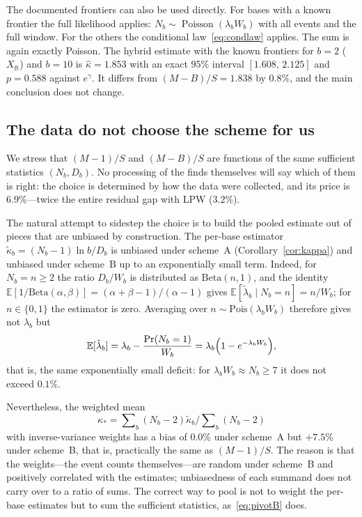 \documentclass[11pt,a4paper]{article}
\theoremstyle{plain}
\theoremstyle{remark}
\newcommand{\eg}{e^{\gamma}}
\DeclareMathOperator{\Pois}{Poisson}
\begin{document}
The documented frontiers can also be used directly. For bases with a known
frontier the full likelihood applies: $N_b\sim\Pois(\lambda_bW_b)$ with all
events and the full window. For the others the conditional
law~\eqref{eq:condlaw} applies. The sum is again exactly Poisson. The hybrid
estimate with the known frontiers for $b=2$ ($X_{\mathrm{ft}}$) and $b=10$ is
$\hat\kappa=1.853$ with an exact $95\%$ interval $[1.608,\,2.125]$ and
$p=0.588$ against $\eg$. It differs from $(M-B)/S=1.838$ by $0.8\%$, and the
main conclusion does not change.

\subsection{The data do not choose the scheme for us}\label{sec:noescape}

We stress that $(M-1)/S$ and $(M-B)/S$ are functions of the same sufficient
statistics $(N_b,D_b)$. No processing of the finds themselves will say which of
them is right: the choice is determined by how the data were collected, and its
price is $6.9\%$---twice the entire residual gap with LPW ($3.2\%$).

The natural attempt to sidestep the choice is to build the pooled estimate out
of pieces that are unbiased by construction. The per-base estimator
$\tilde\kappa_b=(N_b-1)\ln b/D_b$ is unbiased under scheme~A
(Corollary~\ref{cor:kappa}) and unbiased under scheme~B up to an exponentially
small term. Indeed, for $N_b=n\ge2$ the ratio $D_b/W_b$ is distributed as
$\mathrm{Beta}(n,1)$, and the identity
$\mathbb E[1/\mathrm{Beta}(\alpha,\beta)]=(\alpha+\beta-1)/(\alpha-1)$ gives
$\mathbb E[\tilde\lambda_b\mid N_b=n]=n/W_b$; for $n\in\{0,1\}$ the estimator is
zero. Averaging over $n\sim\mathrm{Pois}(\lambda_bW_b)$ therefore gives not
$\lambda_b$ but
\[
  \mathbb E[\tilde\lambda_b]=\lambda_b-\frac{\Pr(N_b=1)}{W_b}
  =\lambda_b\Bigl(1-e^{-\lambda_bW_b}\Bigr),
\]
that is, the same exponentially small deficit: for $\lambda_bW_b\approx N_b\ge7$
it does not exceed $0.1\%$.

Nevertheless, the weighted mean
$$\kappa_\ast=\sum\nolimits_b(N_b-2)\tilde\kappa_b\Big/\sum\nolimits_b(N_b-2)$$
with inverse-variance weights has a bias of $0.0\%$ under scheme~A but
$+7.5\%$ under scheme~B, that is, practically the same as $(M-1)/S$. The reason
is that the weights---the event counts themselves---are random under scheme~B
and positively correlated with the estimates; unbiasedness of each summand does
not carry over to a ratio of sums. The correct way to pool is not to weight the
per-base estimates but to sum the sufficient statistics, as~\eqref{eq:pivotB}
does.
\end{document}

